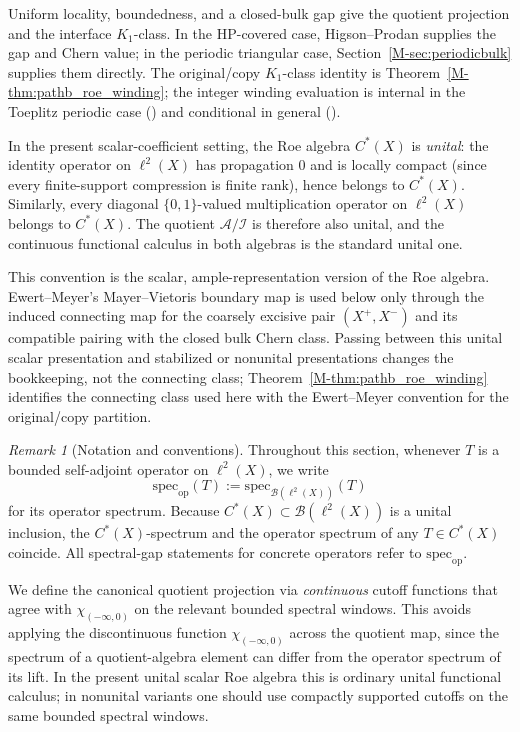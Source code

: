 \documentclass[11pt]{article}
\numberwithin{equation}{section}
\theoremstyle{definition}
\theoremstyle{remark}
\newtheorem{remark}[theorem]{Remark}
\newcommand{\spec}{\mathrm{spec}}
\begin{document}
Uniform locality, boundedness, and a closed-bulk gap give the quotient projection and the
interface \(K_1\)-class. In the HP-covered case, Higson--Prodan supplies the gap and Chern value;
in the periodic triangular case, Section~\ref{M-sec:periodicbulk} supplies them directly. The
original/copy \(K_1\)-class identity is Theorem~\ref{M-thm:pathb_roe_winding}; the integer
winding evaluation is internal in the Toeplitz periodic case
() and conditional in general
().

In the present scalar-coefficient setting, the Roe algebra $C^*(X)$ is \emph{unital}: the identity
operator on $\ell^2(X)$ has propagation $0$ and is locally compact (since every finite-support
compression is finite rank), hence belongs to $C^*(X)$. Similarly, every diagonal
$\{0,1\}$-valued multiplication operator on $\ell^2(X)$ belongs to $C^*(X)$. The quotient
$\mathcal A/\mathcal I$ is therefore also unital, and the continuous functional calculus in both
algebras is the standard unital one.

This convention is the scalar, ample-representation version of the Roe algebra. Ewert--Meyer's
Mayer--Vietoris boundary map is used below only through the induced connecting map for the
coarsely excisive pair \((X^+,X^-)\) and its compatible pairing with the closed bulk Chern class.
Passing between this unital scalar presentation and stabilized or nonunital presentations changes
the bookkeeping, not the connecting class; Theorem~\ref{M-thm:pathb_roe_winding} identifies the
connecting class used here with the Ewert--Meyer convention for the original/copy partition.

\begin{remark}[Notation and conventions]
Throughout this section, whenever $T$ is a bounded self-adjoint operator on $\ell^2(X)$, we write
\[
\spec_{\mathrm{op}}(T):=\spec_{\mathcal B(\ell^2(X))}(T)
\]
for its operator spectrum. Because $C^*(X)\subset\mathcal B(\ell^2(X))$ is a unital inclusion,
the $C^*(X)$-spectrum and the operator spectrum of any $T\in C^*(X)$ coincide. All spectral-gap
statements for concrete operators refer to $\spec_{\mathrm{op}}$.
\end{remark}

We define the canonical quotient projection via \emph{continuous} cutoff functions that agree with
$\chi_{(-\infty,0)}$ on the relevant bounded spectral windows. This avoids applying the
discontinuous function $\chi_{(-\infty,0)}$ across the quotient map, since the spectrum of a
quotient-algebra element can differ from the operator spectrum of its lift. In the present unital
scalar Roe algebra this is ordinary unital functional calculus; in nonunital variants one should use
compactly supported cutoffs on the same bounded spectral windows.
\end{document}
